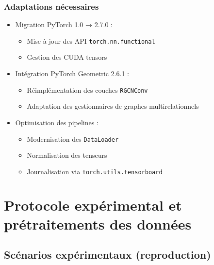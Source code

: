 \documentclass[a4paper,11pt]{article}
\begin{document}
\subsubsection{Adaptations nécessaires}
\begin{itemize}
  \item Migration PyTorch 1.0 → 2.7.0 :
  \begin{itemize}
    \item Mise à jour des API \texttt{torch.nn.functional}
    \item Gestion des CUDA tensors
  \end{itemize}
  
  \item Intégration PyTorch Geometric 2.6.1 :
  \begin{itemize}
    \item Réimplémentation des couches \texttt{RGCNConv}
    \item Adaptation des gestionnaires de graphes multirelationnels
  \end{itemize}
  
  \item Optimisation des pipelines :
  \begin{itemize}
    \item Modernisation des \texttt{DataLoader}
    \item Normalisation des tenseurs
    \item Journalisation via \texttt{torch.utils.tensorboard}
  \end{itemize}
\end{itemize}

\newpage

\section{Protocole expérimental et prétraitements des données}

\subsection{Scénarios expérimentaux (reproduction)}
\end{document}
